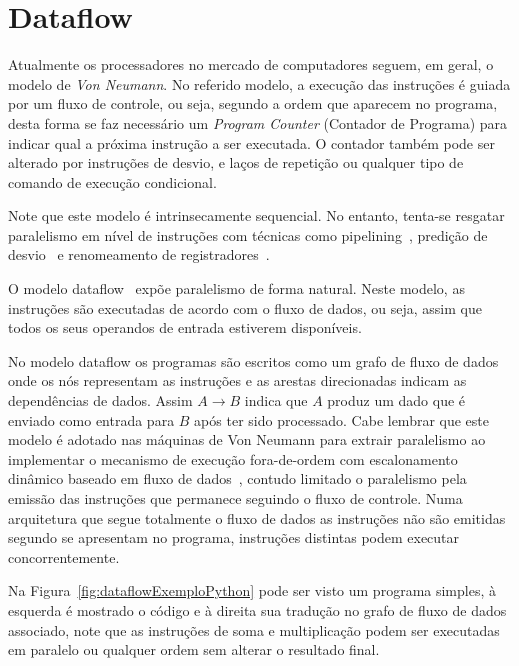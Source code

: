 \section{Dataflow} \label{sec:conceitosDataflow}

Atualmente os processadores no mercado de computadores seguem, em geral, o modelo de \textit{Von Neumann}.
No referido modelo, a execução das instruções é guiada por um fluxo de controle, ou seja, segundo a ordem que aparecem no programa, desta forma se faz necessário um \textit{Program Counter} (Contador de Programa) para indicar qual a próxima instrução a ser executada.
O contador também pode ser alterado por instruções de desvio, e laços de repetição ou qualquer tipo de comando de execução condicional.

Note que este modelo é intrinsecamente sequencial. No entanto, tenta-se resgatar paralelismo em nível de instruções com técnicas como pipelining~\cite{patterson2003computerOrganization}, predição de desvio~\cite{patterson2003computerOrganization} e renomeamento de registradores~\cite{patterson2012}.

O modelo dataflow~\cite{2468, Swanson2003, 642111, Davis:1978:ASM:800094.803050, 714523, Shimada:1986:EPD:17356.17383, Kishi:1983:DDD:1067651.801661, Grafe:1989:EDP:74925.74930, 134511, Swanson:2007:WA:1233307.1233308} expõe paralelismo de forma natural.
Neste modelo, as instruções são executadas de acordo com o fluxo de dados, ou seja, assim que todos os seus operandos de entrada estiverem disponíveis.

No modelo dataflow os programas são escritos como um grafo de fluxo de dados onde os nós representam as instruções e as arestas direcionadas indicam as dependências de dados.
Assim $A \rightarrow B$ indica que $A$ produz um dado que é enviado como entrada para $B$ após ter sido processado.
Cabe lembrar que este modelo é adotado nas máquinas de Von Neumann para extrair paralelismo ao implementar o mecanismo de execução fora-de-ordem com escalonamento dinâmico baseado em fluxo de dados~\cite{tomasulo}, contudo limitado o paralelismo pela emissão das instruções que permanece seguindo o fluxo de controle.
Numa arquitetura que segue totalmente o fluxo de dados as instruções não são emitidas segundo se apresentam no programa, instruções distintas podem executar concorrentemente.

Na Figura~\ref{fig:dataflowExemploPython} pode ser visto um programa simples, à esquerda é mostrado o código e à direita sua tradução no grafo de fluxo de dados associado, note que as instruções de soma e multiplicação podem ser executadas em paralelo ou qualquer ordem sem alterar o resultado final.

